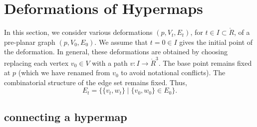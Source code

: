 %
%
%
%









\section{Deformations of Hypermaps}

In this section, we consider various deformations $(p,V_t,E_t)$,
for $t\in I\subset \ring{R}$, of
a pre-planar graph $(p,V_0,E_0)$.  
We assume that $t=0\in I$ gives the initial point
of the deformation.  
In general, these deformations
are obtained by choosing replacing each vertex $v_0\in V$
with a path $v:I\to \ring{R}^3$.  
The base point remains fixed at $p$ 
(which we have renamed from $v_0$ to
avoid notational conflicts).
The combinatorial structure of the edge set remains
fixed.  
Thus,  
   $$
   E_t = \{ \{v_t,w_t\} \mid \{v_0,w_0\}\in E_0\}.
   $$


\subsection{connecting a hypermap}


